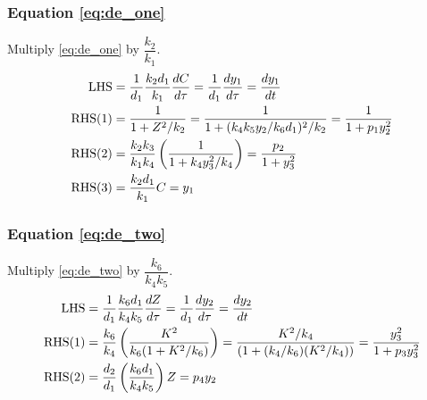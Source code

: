\documentclass[10pt,letterpaper]{article}
\begin{document}
\subsubsection{Equation \eqref{eq:de_one}}
Multiply \eqref{eq:de_one} by $\dfrac{k_2}{k_1}$.
\begin{equation*} 
\begin{gathered}\begin{aligned}
{\rm LHS} &= \frac{1}{d_1} \frac{k_2 d_1}{k_1} \frac{dC}{d\tau}
           = \frac{1}{d_1} \frac{dy_1}{d\tau}
           = \frac{dy_1}{dt} \\
{\rm RHS(1)} &= \frac{1}{1 + Z^2/k_2}
              = \frac{1}{1 + (k_4 k_5 y_2 / k_6 d_1)^2/k_2}
              = \frac{1}{1 + p_1 y_2^2} \\
{\rm RHS(2)} &= \frac{k_2 k_3}{k_1 k_4} \left( \frac{1}{1 + k_4 y_3^2/k_4} \right)
              = \frac{p_2}{1 + y_3^2}  \\
{\rm RHS(3)} &= \frac{k_2 d_1}{k_1} C = y_1
\end{aligned}\end{gathered}
\end{equation*}

\subsubsection{Equation \eqref{eq:de_two}}
Multiply \eqref{eq:de_two} by $\dfrac{k_6}{k_4 k_5}$.
\begin{equation*}
\begin{gathered}\begin{aligned}
{\rm LHS} &= \frac{1}{d_1} \frac{k_6 d_1}{k_4 k_5} \frac{dZ}{d\tau}
           = \frac{1}{d_1} \frac{dy_2}{d\tau}
           = \frac{dy_2}{dt} \\
{\rm RHS(1)} &= \frac{k_6}{k_4} \left( \frac{K^2}{k_6(1 + K^2/k_6)} \right)
              = \frac{K^2/k_4}{(1 + (k_4/k_6)(K^2/k_4))}
              = \frac{y_3^2}{1 + p_3 y_3^2} \\
{\rm RHS(2)} &= \frac{d_2}{d_1}\left(\frac{k_6 d_1}{k_4 k_5}\right) Z
              = p_4 y_2
\end{aligned}\end{gathered}
\end{equation*}
\end{document}
